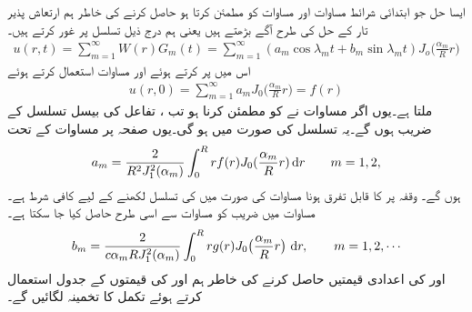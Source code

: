  \quad ایسا حل جو ابتدائی شرائط مساوات  اور مساوات  کو مطمئن کرتا ہو حاصل کرنے کی خاطر ہم ارتعاش پذیر تار کے حل کی طرح آگے بڑھتے ہیں یعنی ہم درج ذیل تسلسل پر غور کرتے ہیں۔
\begin{align}\label{مساوات_جزوی_دائری_حل_ٹ}
u(r,t)=\sum_{m=1}^{\infty} W(r)G_m(t)=\sum_{m=1}^{\infty} (a_m\cos\lambda_mt+b_m\sin\lambda_mt)J_o\big(\frac{\alpha_m}{R}r\big)
\end{align}
اس میں  پر کرتے ہوئے  اور مساوات  استعمال کرتے ہوئے 
\begin{align}\label{مساوات_جزوی_دائری_حل_ث}
u(r,0)=\sum_{m=1}^{\infty} a_mJ_0\big(\frac{\alpha_m}{R}r\big)=f(r)
\end{align}
ملتا ہے۔یوں اگر مساوات  نے  کو مطمئن کرنا ہو تب ، تفاعل  کی بیسل تسلسل  کے  ضریب  ہوں گے۔یہ تسلسل  کی صورت میں ہو گی۔یوں صفحہ  پر مساوات  کے تحت
\begin{align}\label{مساوات_جزوی_دائری_حل_ج}
a_m=\frac{2}{R^2J^2_1(\alpha_{m})}\int_0^R rf(r)J_0(\frac{\alpha_m}{R}r)\dif r\quad \quad m=1,2,
\end{align}
ہوں گے۔ وقفہ  پر  کا قابل تفرق ہونا مساوات  کی صورت میں  کی تسلسل لکھنے کے لیے کافی شرط ہے۔مساوات  میں  ضریب   کو مساوات  سے اسی طرح  حاصل کیا جا سکتا ہے۔
\begin{align}\label{مساوات_جزوی_دائری_حل_چ}
b_m=\frac{2}{c\alpha_m RJ_1^2(\alpha_m)}\int_0^R rg(r)J_0\big(\frac{\alpha_m}{R}r\big)\,\dif r,\quad \quad m=1,2,\cdots
\end{align}
 اور  کی اعدادی قیمتیں حاصل کرنے کی خاطر ہم  اور  کی قیمتوں کے جدول استعمال کرتے ہوئے تکمل کا تخمینہ لگائیں گے۔


